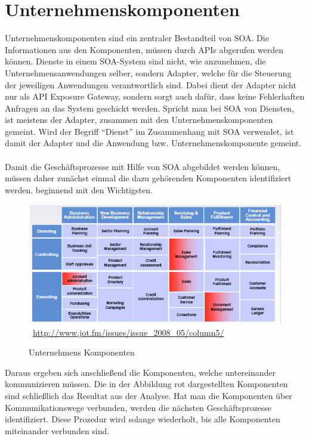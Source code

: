 \section{Unternehmenskomponenten}
\label{sec:UnternehmensKomponenten}
Unternehmenskomponenten sind ein zentraler Bestandteil von SOA. Die Informationen aus den Komponenten, müssen durch APIs abgerufen werden können. Dienste in einem SOA-System sind nicht, wie anzunehmen, die Unternehmensanwendungen selber, sondern Adapter, welche für die Steuerung der jeweiligen Anwendungen verantwortlich sind. Dabei dient der Adapter nicht nur als API Exposure Gateway, sondern sorgt auch dafür, dass keine Fehlerhaften Anfragen an das System geschickt werden. Spricht man bei SOA von Diensten, ist meistens der Adapter, zusammen mit den Unternehmenskomponenten gemeint. Wird der Begriff "`Dienst"' im Zusammenhang mit SOA verwendet, ist damit der Adapter und die Anwendung bzw. Unternehmenskomponente gemeint.
\\\\
Damit die Geschäftsprozesse mit Hilfe von SOA abgebildet werden können, müssen daher zunächst einmal die dazu gehörenden Komponenten identifiziert werden. beginnend mit den Wichtigsten.

\begin{figure}[htb]
    \centering 
    \includegraphics[width=\linewidth]{content/images/UnternehmensKomponenten}\
    \quelle\url{http://www.jot.fm/issues/issue_2008_05/column5/}
    \caption[Unternehmens Komponenten]{Unternehmens Komponenten\\}
    \label{fig:UnternehmensKomponenten}  
\end{figure} 
\newpage
Daraus ergeben sich anschließend die Komponenten, welche untereinander kommunizieren müssen. Die in der Abbildung rot dargestellten Komponenten sind schließlich das Resultat aus der Analyse. Hat man die Komponenten über Kommunikationswege verbunden, werden die nächsten Geschäftsprozesse identifiziert. Diese Prozedur wird solange wiederholt, bis alle Komponenten miteinander verbunden sind.

